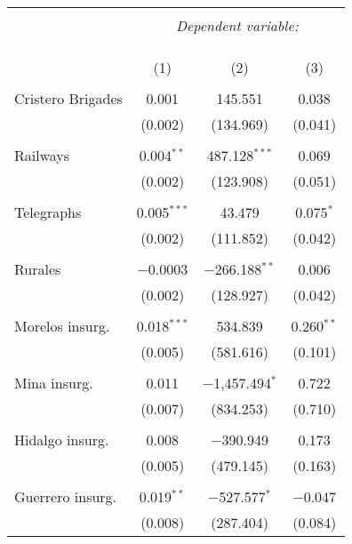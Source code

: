 
\begin{table}[!htbp] \centering 
  \caption{} 
  \label{} 
\begin{tabular}{@{\extracolsep{5pt}}lccc} 
\\[-1.8ex]\hline 
\hline \\[-1.8ex] 
 & \multicolumn{3}{c}{\textit{Dependent variable:}} \\ 
\cline{2-4} 
\\[-1.8ex] & \multicolumn{3}{c}{ } \\ 
\\[-1.8ex] & (1) & (2) & (3)\\ 
\hline \\[-1.8ex] 
 Cristero Brigades & 0.001 & 145.551 & 0.038 \\ 
  & (0.002) & (134.969) & (0.041) \\ 
  & & & \\ 
 Railways & 0.004$^{**}$ & 487.128$^{***}$ & 0.069 \\ 
  & (0.002) & (123.908) & (0.051) \\ 
  & & & \\ 
 Telegraphs & 0.005$^{***}$ & 43.479 & 0.075$^{*}$ \\ 
  & (0.002) & (111.852) & (0.042) \\ 
  & & & \\ 
 Rurales & $-$0.0003 & $-$266.188$^{**}$ & 0.006 \\ 
  & (0.002) & (128.927) & (0.042) \\ 
  & & & \\ 
 Morelos insurg. & 0.018$^{***}$ & 534.839 & 0.260$^{**}$ \\ 
  & (0.005) & (581.616) & (0.101) \\ 
  & & & \\ 
 Mina insurg. & 0.011 & $-$1,457.494$^{*}$ & 0.722 \\ 
  & (0.007) & (834.253) & (0.710) \\ 
  & & & \\ 
 Hidalgo insurg. & 0.008 & $-$390.949 & 0.173 \\ 
  & (0.005) & (479.145) & (0.163) \\ 
  & & & \\ 
 Guerrero insurg. & 0.019$^{**}$ & $-$527.577$^{*}$ & $-$0.047 \\ 
  & (0.008) & (287.404) & (0.084) \\ 

\end{tabular}
\end{table}
